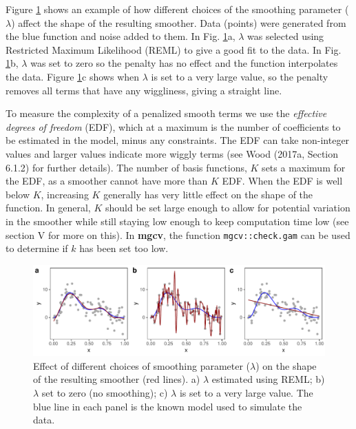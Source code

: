 \documentclass[12pt]{article}
\begin{document}
Figure \ref{fig:Fig2} shows an example of how different choices of the
smoothing parameter (\(\lambda\)) affect the shape of the resulting
smoother. Data (points) were generated from the blue function and noise
added to them. In Fig. \ref{fig:Fig2}a, \(\lambda\) was selected using
Restricted Maximum Likelihood (REML) to give a good fit to the data. In
Fig. \ref{fig:Fig2}b, \(\lambda\) was set to zero so the penalty has no
effect and the function interpolates the data. Figure \ref{fig:Fig2}c
shows when \(\lambda\) is set to a very large value, so the penalty
removes all terms that have any wiggliness, giving a straight line.

To measure the complexity of a penalized smooth terms we use the
\emph{effective degrees of freedom} (EDF), which at a maximum is the
number of coefficients to be estimated in the model, minus any
constraints. The EDF can take non-integer values and larger values
indicate more wiggly terms (see Wood (2017a, Section 6.1.2) for further
details). The number of basis functions, \(K\) sets a maximum for the
EDF, as a smoother cannot have more than \(K\) EDF. When the EDF is well
below \(K\), increasing \(K\) generally has very little effect on the
shape of the function. In general, \(K\) should be set large enough to
allow for potential variation in the smoother while still staying low
enough to keep computation time low (see section V for more on this). In
\textbf{mgcv}, the function \texttt{mgcv::check.gam} can be used to
determine if \(k\) has been set too low.

\begin{figure}
\includegraphics[width=\linewidth]{../figures/Fig2} \caption{\label{fig:Fig2}Effect of different choices of smoothing parameter ($\lambda$) on the shape of the resulting smoother (red lines). a) $\lambda$ estimated using REML; b) $\lambda$ set to zero (no smoothing); c) $\lambda$ is set to a very large value. The blue line in each panel is the known model used to simulate the data.}\label{fig:Fig2}
\end{figure}
\end{document}
